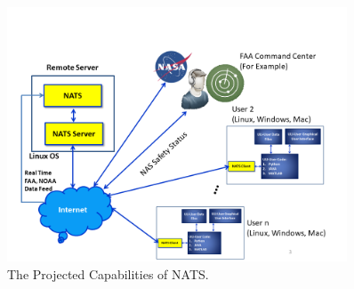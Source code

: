 \documentclass[11pt]{book}              %
\begin{document}
\begin{figure}[H]
\includegraphics[width=0.9\textwidth]{Pictures/Slide3.PNG}
\caption{The Projected Capabilities of NATS. \label{fig:NATSfinal}}
\end{figure}
\end{document}
